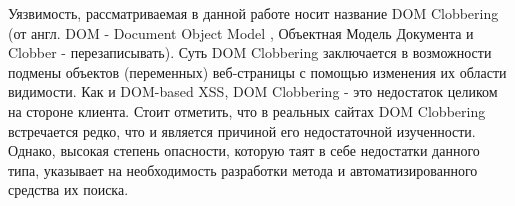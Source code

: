Уязвимость, рассматриваемая в данной работе носит название DOM Clobbering (от англ. DOM - Document Object Model \cite{dom}, Объектная Модель Документа и Clobber - перезаписывать). Суть DOM Clobbering заключается в возможности подмены объектов (переменных) веб-страницы с помощью изменения их области видимости. Как и DOM-based XSS, DOM Clobbering - это недостаток целиком на стороне клиента. Стоит отметить, что в реальных сайтах DOM Clobbering встречается редко, что и является причиной его недостаточной изученности. Однако, высокая степень опасности, которую таят в себе недостатки данного типа, указывает на необходимость разработки метода и автоматизированного средства их поиска.